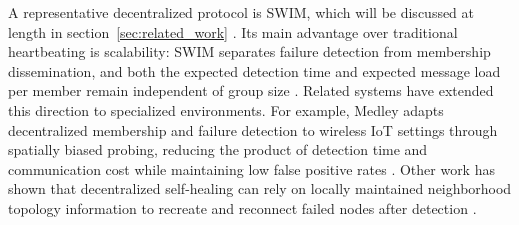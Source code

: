 A representative decentralized protocol is SWIM, which will be discussed at length in section~\ref{sec:related_work}
\cite{dasSWIMScalableWeaklyconsistent2002}. Its main advantage over traditional heartbeating is scalability: SWIM
separates failure detection from membership dissemination, and both the expected detection time and expected message
load per member remain independent of group size \cite{dasSWIMScalableWeaklyconsistent2002}. Related systems have
extended this direction to specialized environments. For example, Medley adapts decentralized membership and failure
detection to wireless IoT settings through spatially biased probing, reducing the product of detection time and
communication cost while maintaining low false positive rates \cite{yangMedleyMembershipService2022}. Other work has
shown that decentralized self-healing can rely on locally maintained neighborhood topology information to recreate and
reconnect failed nodes after detection \cite{rodriguezDecentralisedSelfHealingApproach2021}.





